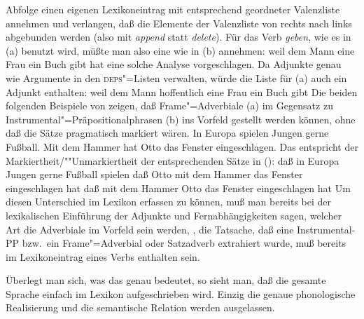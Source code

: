 Abfolge einen eigenen Lexikoneintrag mit entsprechend geordneter Valenzliste annehmen
und verlangen, daß die Elemente der Valenzliste von rechts nach links abgebunden werden
(also mit \emph{append} statt \emph{delete}). Für das Verb \emph{geben}, wie es in (a)
benutzt wird, müßte man also eine \subcatl wie in (b) annehmen:
\eal
\ex weil dem Mann eine Frau ein Buch gibt
\ex {}
\zl
\citet{Uszkoreit86b} hat eine solche Analyse vorgeschlagen.
Da \citet*{BMS2001a} Adjunkte genau wie Argumente in den \textsc{deps}"=Listen verwalten, würde die Liste
für (a) auch ein Adjunkt enthalten:
\eal
\ex weil dem Mann hoffentlich eine Frau ein Buch gibt
\ex {}
\zl
Die beiden folgenden Beispiele von \citet{Frey2004a} zeigen, daß
Frame"=Adverbiale (a) im Gegensatz zu Instrumental"=Präpositionalphrasen (b) ins
Vorfeld gestellt werden können, ohne daß die Sätze pragmatisch markiert wären.
\eal
\ex In Europa spielen Jungen gerne Fußball. 
\ex Mit dem Hammer hat Otto das Fenster eingeschlagen.
\zl
Das entspricht der Markiertheit/""Unmarkiertheit der entsprechenden Sätze in ():
\eal
\ex daß in Europa Jungen gerne Fußball spielen
\ex daß Otto mit dem Hammer das Fenster eingeschlagen hat
\ex daß mit dem Hammer Otto das Fenster eingeschlagen hat
\zl
Um diesen Unterschied im Lexikon erfassen zu können, muß man bereits bei der lexikalischen
Einführung der Adjunkte und Fernabhängigkeiten sagen, welcher Art die Adverbiale im Vorfeld
sein werden, \dash, die Tatsache, daß eine Instrumental-PP bzw.\ ein Frame"=Adverbial oder Satzadverb
extrahiert wurde, muß bereits im Lexikoneintrag eines Verbs enthalten sein.

Überlegt man sich, was das genau bedeutet, so sieht man, daß die gesamte Sprache einfach im Lexikon
aufgeschrieben wird. Einzig die genaue phonologische Realisierung und die semantische Relation
werden ausgelassen. 

